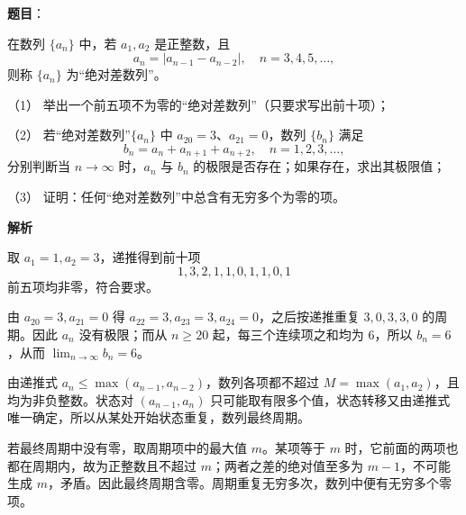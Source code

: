 \begin{answer}

\textbf{题目}：

在数列 $\{a_n\}$ 中，若 $a_1,a_2$ 是正整数，且
\nopagebreak[4]
\[
a_n=|a_{n-1}-a_{n-2}|,\quad n=3,4,5,\ldots,
\]
则称 $\{a_n\}$ 为“绝对差数列”。

（1） 举出一个前五项不为零的“绝对差数列”（只要求写出前十项）；

（2） 若“绝对差数列”$\{a_n\}$ 中 $a_{20}=3$、$a_{21}=0$，数列 $\{b_n\}$ 满足
\nopagebreak[4]
\[
b_n=a_n+a_{n+1}+a_{n+2},\quad n=1,2,3,\ldots,
\]
分别判断当 $n\to\infty$ 时，$a_n$ 与 $b_n$ 的极限是否存在；如果存在，求出其极限值；

（3） 证明：任何“绝对差数列”中总含有无穷多个为零的项。

\textbf{解析}


取 $a_1=1,a_2=3$，递推得到前十项
\nopagebreak[4]
\[
1,3,2,1,1,0,1,1,0,1
\]
前五项均非零，符合要求。


由 $a_{20}=3,a_{21}=0$ 得 $a_{22}=3,a_{23}=3,a_{24}=0$，之后按递推重复 $3,0,3,3,0$ 的周期。因此 $a_n$ 没有极限；而从 $n\ge20$ 起，每三个连续项之和均为 $6$，所以 $b_n=6$，从而 $\lim_{n\to\infty}b_n=6$。


由递推式 $a_n\le\max(a_{n-1},a_{n-2})$，数列各项都不超过 $M=\max(a_1,a_2)$，且均为非负整数。状态对 $(a_{n-1},a_n)$ 只可能取有限多个值，状态转移又由递推式唯一确定，所以从某处开始状态重复，数列最终周期。

若最终周期中没有零，取周期项中的最大值 $m$。某项等于 $m$ 时，它前面的两项也都在周期内，故为正整数且不超过 $m$；两者之差的绝对值至多为 $m-1$，不可能生成 $m$，矛盾。因此最终周期含零。周期重复无穷多次，数列中便有无穷多个零项。




\end{answer}